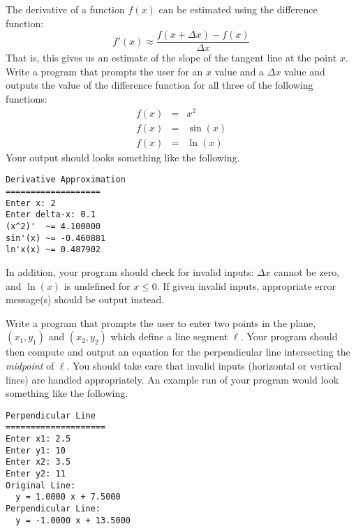 \begin{exer}
The derivative of a function $f(x)$ can be estimated using the difference function:
  $$f'(x) \approx \frac{f(x+\Delta x) - f(x)}{\Delta x}$$
That is, this gives us an estimate of the slope of the tangent line at the point $x$.  
Write a program that prompts the user for an $x$ value and a $\Delta x$ value and 
outputs the value of the difference function for all three of the following functions:
  $$\begin{array}{rcl}
  	f(x) & = & x^2 \\
	f(x) & = & \sin(x) \\
	f(x) & = & \ln(x)
    \end{array}$$
Your output should looks something like the following.

\begin{verbatim}
Derivative Approximation
===================
Enter x: 2
Enter delta-x: 0.1
(x^2)'  ~= 4.100000
sin'(x) ~= -0.460881
ln'x(x) ~= 0.487902
\end{verbatim}

In addition, your program should check for invalid inputs: $\Delta x$ cannot be zero, and $\ln(x)$ is undefined
for $x \leq 0$.  If given invalid inputs, appropriate error message(s) should be output instead.
\end{exer}

\begin{exer}
Write a program that prompts the user to enter two points in the plane, $(x_1, y_1)$ 
and $(x_2, y_2)$ which define a line segment $\ell$.  Your program should then compute 
and output an equation for the perpendicular line intersecting the \emph{midpoint} of $\ell$.  
You should take care that invalid inputs (horizontal or vertical lines) are handled appropriately.
An example run of your program would look something like the following.

\begin{verbatim}
Perpendicular Line
====================
Enter x1: 2.5
Enter y1: 10
Enter x2: 3.5
Enter y2: 11
Original Line: 
  y = 1.0000 x + 7.5000
Perpendicular Line: 
  y = -1.0000 x + 13.5000
\end{verbatim}
\end{exer}

